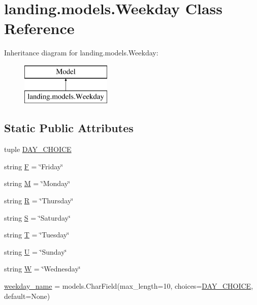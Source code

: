 \hypertarget{classlanding_1_1models_1_1Weekday}{}\section{landing.\+models.\+Weekday Class Reference}
\label{classlanding_1_1models_1_1Weekday}
Inheritance diagram for landing.\+models.\+Weekday\+:\begin{figure}[H]
\begin{center}
\leavevmode
\includegraphics[height=2.000000cm]{classlanding_1_1models_1_1Weekday}
\end{center}
\end{figure}
\subsection*{Static Public Attributes}
\begin{DoxyCompactItemize}
\item 
tuple \mbox{\hyperlink{classlanding_1_1models_1_1Weekday_a7087116a99b548d0bfb99890d31b377a}{D\+A\+Y\+\_\+\+C\+H\+O\+I\+CE}}
\item 
string \mbox{\hyperlink{classlanding_1_1models_1_1Weekday_a7d9b7483659a0aa50e092bf758996cf1}{F}} = \char`\"{}Friday\char`\"{}
\item 
string \mbox{\hyperlink{classlanding_1_1models_1_1Weekday_ae349eee8108d59ddf4243538573aaaf4}{M}} = \char`\"{}Monday\char`\"{}
\item 
string \mbox{\hyperlink{classlanding_1_1models_1_1Weekday_ab05738a86ee9da4074c0b952a93e72e6}{R}} = \char`\"{}Thursday\char`\"{}
\item 
string \mbox{\hyperlink{classlanding_1_1models_1_1Weekday_afa57d936d921fb3d04172f0a7d690487}{S}} = \char`\"{}Saturday\char`\"{}
\item 
string \mbox{\hyperlink{classlanding_1_1models_1_1Weekday_ad441355f3f8b49c6de57ac0c0c90bd80}{T}} = \char`\"{}Tuesday\char`\"{}
\item 
string \mbox{\hyperlink{classlanding_1_1models_1_1Weekday_a2f5a7e4156f129c1dc20ff99bc71e72c}{U}} = \char`\"{}Sunday\char`\"{}
\item 
string \mbox{\hyperlink{classlanding_1_1models_1_1Weekday_a83e04a50723b1b692c2a0e0ca2e67068}{W}} = \char`\"{}Wednesday\char`\"{}
\item 
\mbox{\hyperlink{classlanding_1_1models_1_1Weekday_abf96c7b22336690bfb2fedd04a422ea2}{weekday\+\_\+name}} = models.\+Char\+Field(max\+\_\+length=10, choices=\mbox{\hyperlink{classlanding_1_1models_1_1Weekday_a7087116a99b548d0bfb99890d31b377a}{D\+A\+Y\+\_\+\+C\+H\+O\+I\+CE}}, default=None)
\end{DoxyCompactItemize}


